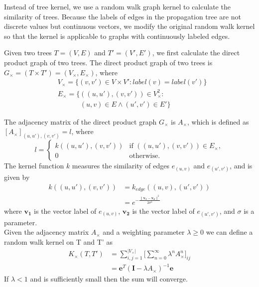 Instead of tree kernel, we use a random walk graph kernel
\cite{gartner2003graph} to calculate the similarity of trees. Because
the labels of edges in the propagation tree are not discrete values but
continuous vectors, we modify the original random walk kernel so that
the kernel is applicable to graphs with continuously labeled
edges\cite{neuhaus2006random}.

Given two trees $T=(V,E)$ and $T'=(V',E')$, we first calculate the direct product graph of two trees. The direct product graph of two trees is $G_\times = (T \times T') = (V_\times,E_\times)$, where
\begin{equation}
\begin{aligned}
&V_\times = \{(v,v')\in V\times V':label(v)=label(v')\}\\
&E_\times = \{((u,u'),(v,v'))\in V_\times^2:\\
&\qquad\quad\ (u,v)\in E \wedge(u',v')\in E'\}
\end{aligned}
\end{equation}

The adjacency matrix of the direct product graph $G_\times$ is $A_\times$, which is defined as
$[A_\times]_{(u,u'),(v,v')} =l$, where
\begin{equation}
l =\left\{ \begin{array}{ll}
k((u,u'),(v,v'))& \mbox{if~} ((u,u'),(v,v'))\in E_\times,\\
0& \mbox{otherwise.}
\end{array}\right.
\end{equation}
The kernel function $k$ measures the similarity of edges $e_{(u,v)}$ and $e_{(u',v')}$,
and is given by
\begin{equation}
\begin{aligned}
k((u,u'),(v,v')) &= k_{edge}((u,v),(u',v'))\\
                 &= e^{-\frac{\|\boldsymbol{v_1}- \boldsymbol{v_2}\|^2}{2\sigma^2}}
\end{aligned}
\end{equation}
where $\boldsymbol{v_1}$ is the vector label of $e_{(u,v)}$, $\boldsymbol{v_2}$ is the vector label of $e_{(u',v')}$, and $\sigma$ is a parameter.\\

Given the adjacency matrix $A_\times$ and a weighting parameter $\lambda \ge 0$ we can define a random walk kernel on T and T' as
\begin{equation}
\label{eq:kernel}
\begin{aligned}
K_\times(T,T') &= \sum_{i,j=1}^{|V_\times|}\big[\sum_{n=0}^{\infty}\lambda ^n A_\times^n\big]_{ij}\\
               &= \boldsymbol{e}^T(\boldsymbol{I}-\lambda A_\times)^{-1}\boldsymbol{e}
\end{aligned}
\end{equation}
If $\lambda < 1$ and is sufficiently small then the sum will converge.

